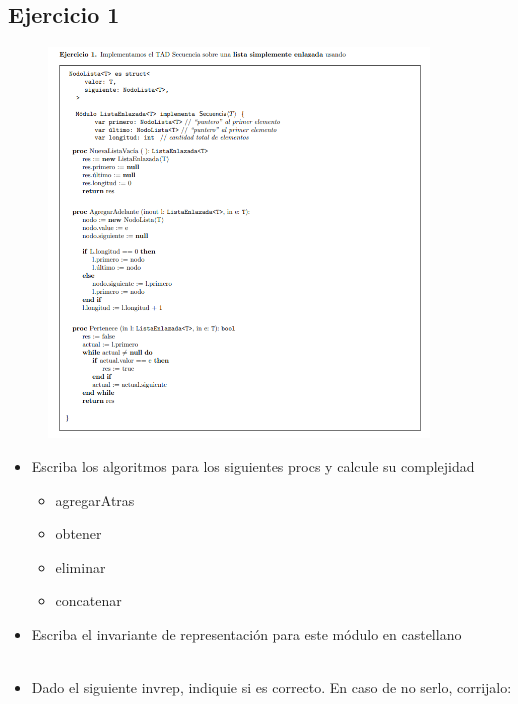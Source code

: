\documentclass[11pt]{article}
\begin{document}
    \maketitle
    \subsection*{Ejercicio 1}
    \begin{figure}[h]
        \centering
        \includegraphics[width=0.9\textwidth]{../static/ejercicio1.png}
    \end{figure}
    \begin{itemize}
        \item Escriba los algoritmos para los siguientes procs y calcule su complejidad
        \begin{itemize}
            \item agregarAtras
            \item obtener
            \item eliminar
            \item concatenar
        \end{itemize}
        \item Escriba el invariante de representación para este módulo en castellano \\ \\

        \item Dado el siguiente invrep, indiquie si es correcto. En caso de no serlo, corrijalo:


    \end{itemize}
\end{document}
